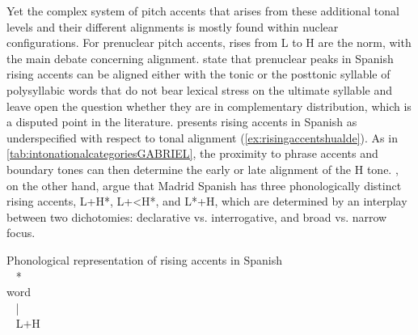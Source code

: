 
Yet the complex system of pitch accents that arises from these additional tonal levels and their different alignments is mostly found within nuclear configurations. For prenuclear pitch accents, rises from L to H are the norm, with the main debate concerning alignment. \citet{HualdePrieto2015} state that prenuclear peaks in Spanish rising accents can be aligned either with the tonic or the posttonic syllable of polysyllabic words that do not bear lexical stress on the ultimate syllable and leave open the question whether they are in complementary distribution, which is a disputed point in the literature. \citet[106]{Hualde.2002} presents rising accents in Spanish as underspecified with respect to tonal alignment (\ref{ex:risingaccentshualde}). As in \autoref{tab:intonationalcategoriesGABRIEL}, the proximity to phrase accents and boundary tones can then determine the early or late alignment of the H tone. \citet{FacePrieto.2007}, on the other hand, argue that Madrid Spanish has three phonologically distinct rising accents, L+H*, L+<H*, and L*+H, which are determined by an interplay between two dichotomies: declarative vs. interrogative, and broad vs. narrow focus.

\begin{exe}
\ex\label{ex:risingaccentshualde} Phonological representation of rising accents in Spanish \citep[106]{Hualde.2002}\\
~\hspace*{2em} * \\
\glll [..... ($\sigma$) .....] word\\
~  | ~ ~ \\
~ L$+$H \\
\end{exe}

%
%
%
%
%
%




